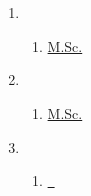 \section{\appendixtrans}\label{sec:appendix}

\bigskip{}

\begin{enumerate}
  \item \fhac
    \begin{enumerate}
      \item \hyperlink{include/certificates/Masterurkunde_compressed.pdf.1}{\certificate{} M.Sc.}
    \end{enumerate}

  \item \uwm
    \begin{enumerate}
      \item \hyperlink{include/certificates/UWM_Diploma_page_1_compressed.pdf.1}{\diploma{} M.Sc.}
    \end{enumerate}


  \item \cae
    \begin{enumerate}
      \item \hyperlink{include/certificates/Arbeitszeugnis_CAE.pdf.1}{\certofemployment~\matse}
    \end{enumerate}

\end{enumerate}

